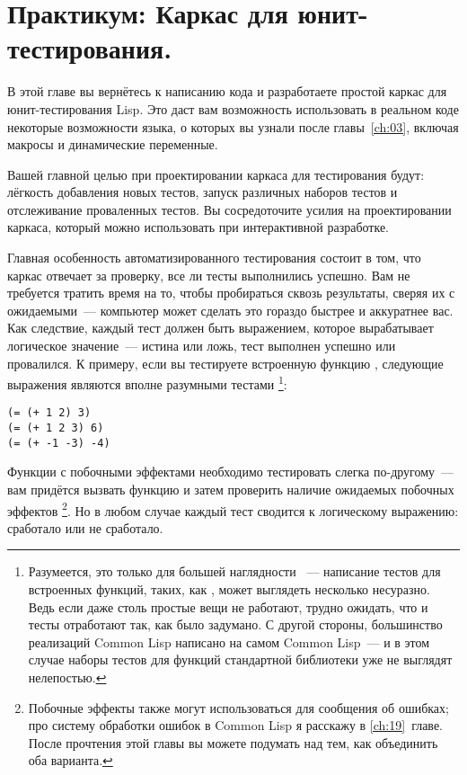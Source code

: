 \chapter{Практикум: Каркас для юнит-тестирования.}
\label{ch:09}

В этой главе вы вернётесь к написанию кода и разработаете простой каркас для
юнит-тестирования Lisp. Это даст вам возможность использовать в реальном коде некоторые
возможности языка, о которых вы узнали после главы~\ref{ch:03}, включая макросы и динамические
переменные.

Вашей главной целью при проектировании каркаса для тестирования будут: лёгкость добавления
новых тестов, запуск различных наборов тестов и отслеживание проваленных тестов. Вы
сосредоточите усилия на проектировании каркаса, который можно использовать при
интерактивной разработке.

Главная особенность автоматизированного тестирования состоит в том, что каркас отвечает за
проверку, все ли тесты выполнились успешно. Вам не требуется тратить время на то, чтобы
пробираться сквозь результаты, сверяя их с ожидаемыми~--- компьютер может сделать это
гораздо быстрее и аккуратнее вас. Как следствие, каждый тест должен быть выражением,
которое вырабатывает логическое значение~--- истина или ложь, тест выполнен успешно или
провалился. К примеру, если вы тестируете встроенную функцию \code{+}, следующие выражения
являются вполне разумными тестами \footnote{Разумеется, это только для большей наглядности
 ~--- написание тестов для встроенных функций, таких, как \code{+}, может выглядеть
  несколько несуразно. Ведь если даже столь простые вещи не работают, трудно ожидать, что
  и тесты отработают так, как было задумано. С другой стороны, большинство реализаций
  Common Lisp написано на самом Common Lisp~--- и в этом случае наборы тестов для функций
  стандартной библиотеки уже не выглядят нелепостью.}:

\begin{lstlisting}
(= (+ 1 2) 3)
(= (+ 1 2 3) 6)
(= (+ -1 -3) -4)
\end{lstlisting}

Функции с побочными эффектами необходимо тестировать слегка по-другому~--- вам придётся
вызвать функцию и затем проверить наличие ожидаемых побочных эффектов \footnote{Побочные
  эффекты также могут использоваться для сообщения об ошибках; про систему обработки
  ошибок в Common Lisp я расскажу в \ref{ch:19}~главе.  После прочтения этой главы вы можете
  подумать над тем, как объединить оба варианта.}. Но в любом случае каждый тест сводится
к логическому выражению: сработало или не сработало.

